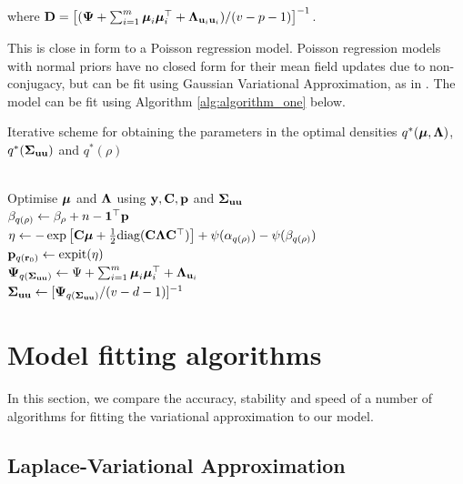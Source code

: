 \documentclass{article}[12pt]
\begin{document}
where ${\bf D} = \left[ ({\boldsymbol \Psi} + \sum_{i=1}^m {\boldsymbol \mu}_i {\boldsymbol \mu}_i^\top + {\boldsymbol \Lambda}_{{\bf u}_i{\bf u}_i}) / (v - p - 1) \right]^{-1}$. 

This is close in form to a Poisson regression model. Poisson regression models with normal priors have no
closed form for their mean field updates due to non- conjugacy, but can be fit using Gaussian Variational
Approximation, as in \citep{ormerod09}. The model can be fit using Algorithm \ref{alg:algorithm_one} below.

\begin{algorithm}
\caption[Algorithm 1]{Iterative scheme for obtaining the parameters in the
optimal densities $q^*({\boldsymbol \mu}, {\boldsymbol \Lambda})$, $q^*({\boldsymbol \Sigma}_{{\bf u} {\bf u}})$ and $q^*(\rho)$}
\label{alg:algorithm_one}
\begin{algorithmic}
 \\[1ex]
\STATE Optimise ${\boldsymbol \mu}$ and ${\boldsymbol \Lambda}$ using ${\bf y}, {\bf C}, {\bf p}$ and ${\boldsymbol \Sigma}_{{\bf u} {\bf u}}$ \\[1ex]
\STATE $\beta_{q(\rho)} \leftarrow \beta_\rho + n - {\bf 1}^\top{\bf p}$ \\[1ex]
\STATE $\eta \leftarrow -\exp \left [ {\bf C} {\boldsymbol \mu} + {\frac{1}{2}} \text{diag}{({\bf C}{\boldsymbol\Lambda}{\bf C}^\top)} \right ] + \psi{(\alpha_{q{(\rho)}})} - \psi{(\beta_{q{(\rho)}})}$ \\[1ex]
\STATE ${\bf p}_{q({\bf r}_0)} \leftarrow \text{expit} (\eta)$ \\[1ex]
\STATE ${\boldsymbol \Psi}_{q({\boldsymbol \Sigma}_{{\bf u} {\bf u}})} \leftarrow \Psi + \sum_{i=1}^m {\boldsymbol \mu}_i {\boldsymbol \mu}_i^\top + {\boldsymbol \Lambda}_{{{\bf u}}_i}$ \\[1ex]
\STATE ${\boldsymbol \Sigma}_{{\bf u}{\bf u}} \leftarrow [{\boldsymbol \Psi}_{q({\boldsymbol \Sigma}_{{\bf u} {\bf u}})}/(v - d - 1)]^{-1}$
\ENDWHILE
\end{algorithmic}
\end{algorithm}

\section{Model fitting algorithms}
\label{sec:algorithms}

In this section, we compare the accuracy, stability and speed of a number of algorithms for fitting the
variational approximation to our model.

\subsection{Laplace-Variational Approximation}
\end{document}
